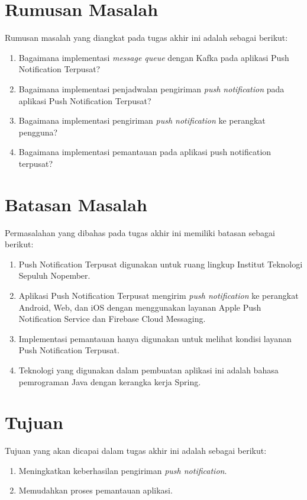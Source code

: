 \section {Rumusan Masalah}
Rumusan masalah yang diangkat pada tugas akhir ini adalah sebagai berikut:
\begin {enumerate}
\item Bagaimana implementasi \textit{message queue} dengan Kafka pada aplikasi Push Notification Terpusat?
\item Bagaimana implementasi penjadwalan pengiriman \textit{push notification} pada aplikasi Push Notification Terpusat?
\item Bagaimana implementasi pengiriman \textit{push notification} ke perangkat pengguna?
\item Bagaimana implementasi pemantauan pada aplikasi push notification terpusat?
\end {enumerate}

\section {Batasan Masalah}
Permasalahan yang dibahas pada tugas akhir ini memiliki batasan sebagai berikut:
\begin {enumerate}
\item Push Notification Terpusat digunakan untuk ruang lingkup Institut Teknologi Sepuluh Nopember.
\item Aplikasi Push Notification Terpusat mengirim \textit{push notification} ke perangkat Android, Web, dan iOS dengan menggunakan layanan Apple Push Notification Service dan Firebase Cloud Messaging.
\item Implementasi pemantauan hanya digunakan untuk melihat kondisi layanan Push Notification Terpusat.
\item Teknologi yang digunakan dalam pembuatan aplikasi ini adalah bahasa pemrograman Java dengan kerangka kerja Spring.
\end {enumerate}

\section {Tujuan}
Tujuan yang akan dicapai dalam tugas akhir ini adalah sebagai berikut:
\begin{enumerate}
	\item Meningkatkan keberhasilan pengiriman \textit{push notification}.
	\item Memudahkan proses pemantauan aplikasi.
\end{enumerate}

